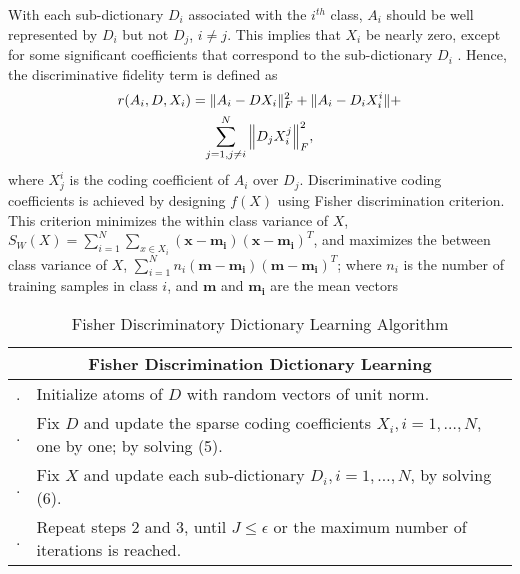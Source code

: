 \documentclass[conference]{IEEEtran}
\begin{document}
	With each sub-dictionary $D_i$ associated with the $i^{th}$ class, $A_i$ should be well represented by $D_i$ but not $D_j$, $i \neq j$. This implies that $X_i$ be nearly zero, except for some significant coefficients that correspond to the sub-dictionary $D_i$ . Hence, the discriminative fidelity term is defined as
	\begin{multline}
		r(A_i,D,X_i)=\Vert{A_i-DX_i}\Vert_F^2+\Vert{A_i-D_iX_i^i}\Vert+ \\
		\sum_{j=1,j\neq i}^{N}\Big\Vert{D_jX_i^j}\Big\Vert_F^2,
	\end{multline}
	where $X_j^i$ is the coding coefficient of $A_i$ over $D_j$. Discriminative coding coefficients is achieved by designing $f(X)$ using Fisher discrimination criterion. This criterion minimizes the within class variance of $X$, $S_W(X)=\sum_{i=1}^{N}\sum_{x\in X_i}(\mathrm{\textbf{x}}-\mathrm{\textbf{m}}_
	\mathrm{\textbf{i}})(\mathrm{\textbf{x}}-\mathrm{\textbf{m}}_\mathrm{\textbf{i}})^T$, and maximizes the between class variance of $X$, $\sum_{i=1}^{N}n_i(\mathrm{\textbf{m}}-\mathrm{\textbf{m}}_\mathrm{\textbf{i}})(\mathrm{\textbf{m}}-\mathrm{\textbf{m}}_\mathrm{\textbf{i}})^T$; where $n_i$ is the number of training samples in class $i$, and $\mathrm{\textbf{m}}$ and $\mathrm{\textbf{m}}_\mathrm{\textbf{i}}$ are the mean vectors
	
	
	\begin{table}
		\caption{Fisher Discriminatory Dictionary Learning Algorithm}
		\label{tab:fisher_disc}
		\begin{tabularx}{\columnwidth}{p{0.01cm} p{}}
			\hline
			\multicolumn{2}{c}{\textbf{Fisher Discrimination Dictionary Learning}} \\
			\hline
			\stepcounter{szaml}\theszaml\stepcounter{szaml}. & Initialize atoms of $D$ with random vectors of unit norm. \\
			\theszaml\stepcounter{szaml}. & Fix $D$ and update the sparse coding coefficients $X_i, i = 1, \dots, N$, one by one; by solving (5). \\
			\theszaml\stepcounter{szaml}. & Fix $X$ and update each sub-dictionary $D_i, i = 1, \dots , N$, by solving (6). \\
			\theszaml\stepcounter{szaml}. & Repeat steps 2 and 3, until $J \leq \epsilon$ or the maximum number of iterations is reached. \\
			\hline
		\end{tabularx}
	\end{table}
	
\end{document}
